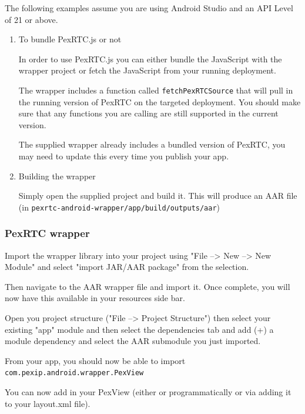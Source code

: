 \documentclass[a4paper,11pt]{article}
\begin{document}
The following examples assume you are using Android Studio and an API
Level of 21 or above.

\begin{enumerate}
\item To bundle PexRTC.js or not
\label{sec:orgheadline59}

In order to use PexRTC.js you can either bundle the JavaScript with the wrapper project or fetch the JavaScript from your running deployment.

The wrapper includes a function called \texttt{fetchPexRTCSource} that will
pull in the running version of PexRTC on the targeted deployment.
You should make sure that any functions you are calling are still
supported in the current version.

The supplied wrapper already includes a bundled version of PexRTC, you
may need to update this every time you publish your app.

\item Building the wrapper
\label{sec:orgheadline60}

Simply open the supplied project and build it.  This will produce an
AAR file (in \texttt{pexrtc-android-wrapper/app/build/outputs/aar})
\end{enumerate}

\subsubsection{PexRTC wrapper}
\label{sec:orgheadline67}

Import the wrapper library into your project using "File --> New -->
New Module" and select "import JAR/AAR package" from the selection.

Then navigate to the AAR wrapper file and import it.  Once complete,
you will now have this available in your resources side bar.

Open you project structure ("File --> Project Structure") then select
your existing "app" module and then select the dependencies tab and
add (+) a module dependency and select the AAR submodule you just
imported.

From your app, you should now be able to import
\texttt{com.pexip.android.wrapper.PexView} 

You can now add in your PexView (either or programmatically or via
adding it to your layout.xml file).
\end{document}
